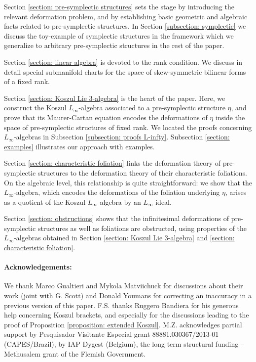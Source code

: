 \documentclass[11pt,thmsa]{amsart}
\theoremstyle{definition}
\begin{document}
\bigskip
{}


Section \ref{section: pre-symplectic structures} sets the stage
by introducing the relevant deformation problem, and by establishing basic geometric and algebraic facts related to pre-symplectic structures. In Section \ref{subsection: symplectic} we discuss the toy-example of symplectic structures in the framework which we generalize to arbitrary pre-symplectic structures in the rest of the paper.



Section \ref{section: linear algebra} is devoted to the rank condition. We discuss in detail special submanifold charts for the space of skew-symmetric bilinear forms of a fixed rank.


Section \ref{section: Koszul Lie 3-algebra} is the heart of the paper. Here, we construct the Koszul $L_\infty$-algebra associated to a pre-symplectic structure $\eta$, and prove that its Maurer-Cartan equation encodes the deformations of $\eta$ inside the space of pre-symplectic structures of fixed rank. We located the proofs concerning $L_\infty$-algebras in Subsection \ref{subsection: proofs L-infty}.
Subsection \ref{section: examples} illustrates our approach with examples.

Section \ref{section: characteristic foliation} links the deformation theory of pre-symplectic structures to the deformation theory of their characteristic foliations.
On the algebraic level, this relationship is quite straightforward: we show that the $L_\infty$-algebra, which encodes the deformations of the foliation underlying $\eta$, arises as a quotient of the Koszul $L_\infty$-algebra by an $L_\infty$-ideal.

Section \ref{section: obstructions} shows that the infinitesimal deformations of   pre-symplectic structures as well as foliations are obstructed, using properties of the $L_\infty$-algebras obtained in Section \ref{section: Koszul Lie 3-algebra} and  \ref{section: characteristic foliation}.
\\

\paragraph{\bf Acknowledgements:}
We thank Marco Gualtieri and Mykola Matviichuck for discussions about
their work \cite{GMS} (joint with G. Scott) and Donald Youmans for correcting an inaccuracy in a previous version of this paper.
F.S. thanks Ruggero Bandiera for his generous help concerning Koszul brackets, and especially for the discussions leading to the proof of Proposition \ref{proposition: extended Koszul}.
M.Z. acknowledges partial support by Pesquisador Visitante Especial grant 88881.030367/2013-01 (CAPES/Brazil), by IAP Dygest (Belgium), 
the long term structural funding -- Methusalem grant of the Flemish Government.  
\\
\end{document}
